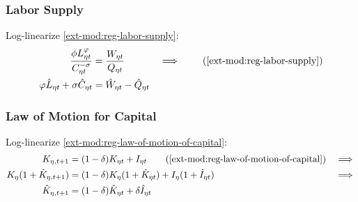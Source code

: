 \documentclass[../thesis.tex]{subfiles}
\begin{document}
\begin{comment}
	\subsubsection*{Regional Terms of Trade}
	
	Log-linearize \ref{ext-mod:reg-total-expense-level-2}:
	\begin{align}
		\hat{Q}_{1t} &= \hat{Q}_{2t} \label{ext-mod:reg-total-expense-level-2-ll}
	\end{align}
\end{comment}


\subsubsection*{Labor Supply}

Log-linearize \ref{ext-mod:reg-labor-supply}:
\begin{alignat}{2}
	\frac{\phi L_{\eta t}^{\varphi}}{C_{\eta t}^{-\sigma}} &= \frac{W_{\eta t}}{Q_{\eta t}} &\implies \tag{\ref{ext-mod:reg-labor-supply}} \\
	\varphi \hat{L}_{\eta t} + \sigma \hat{C}_{\eta t} &= \hat{W}_{\eta t} - \hat{Q}_{\eta t} & \label{ext-mod:reg-ll-labor-supply}
\end{alignat}


\subsubsection*{Law of Motion for Capital}

Log-linearize \ref{ext-mod:reg-law-of-motion-of-capital}:
\begin{alignat}{2}
	K_{\eta,t+1} &= (1 - \delta) K_{\eta t} + I_{\eta t} \tag{\ref{ext-mod:reg-law-of-motion-of-capital}} &\implies \\
	K_{\eta} (1 + \hat{K}_{\eta, t+1}) &= (1-\delta) K_{\eta} (1 + \hat{K}_{\eta t}) + I_{\eta} (1 + \hat{I}_{\eta t}) &\implies \nonumber \\
	\hat{K}_{\eta, t+1} &= (1-\delta) \hat{K}_{\eta t} + \delta \hat{I}_{\eta t} \label{ext-mod:reg-ll-law-of-motion-for-capital}
\end{alignat}
\end{document}
